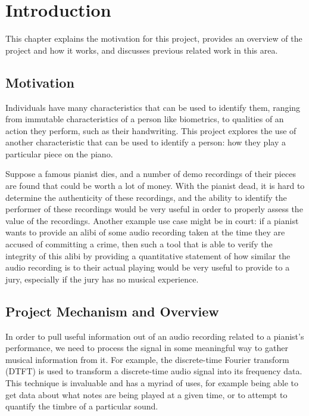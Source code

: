 \documentclass[oneside, class=book, crop=false, 12pt]{standalone}
\begin{document}
\ifstandalone
  \setcounter{chapter}{0}
  \chapter{Introduction}
\fi
{}

This chapter explains the motivation for this project, provides an overview of the project and how it works, and discusses previous related work in this area.

\section{Motivation}

Individuals have many characteristics that can be used to identify them, ranging from immutable characteristics of a person like biometrics, to qualities of an action they perform, such as their handwriting. This project explores the use of another characteristic that can be used to identify a person: how they play a particular piece on the piano. 

Suppose a famous pianist dies, and a number of demo recordings of their pieces are found that could be worth a lot of money. With the pianist dead, it is hard to determine the authenticity of these recordings, and the ability to identify the performer of these recordings would be very useful in order to properly assess the value of the recordings. Another example use case might be in court: if a pianist wants to provide an alibi of some audio recording taken at the time they are accused of committing a crime, then such a tool that is able to verify the integrity of this alibi by providing a quantitative statement of how similar the audio recording is to their actual playing would be very useful to provide to a jury, especially if the jury has no musical experience.

\section{Project Mechanism and Overview}

In order to pull useful information out of an audio recording related to a pianist's performance, we need to process the signal in some meaningful way to gather musical information from it. For example, the discrete-time Fourier transform (DTFT) is used to transform a discrete-time audio signal into its frequency data. This technique is invaluable and has a myriad of uses, for example being able to get data about what notes are being played at a given time, or to attempt to quantify the timbre of a particular sound.
\end{document}
